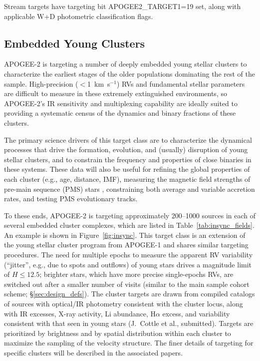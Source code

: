 \documentclass[12pt,twocolumn]{emulateapj}
\begin{document}
Stream targets have targeting bit APOGEE2\_TARGET1=19 set, along with applicable W+D photometric classification flags.


\subsection{Embedded Young Clusters}
\label{sec:young_clusters}

APOGEE-2 is targeting a number of deeply embedded young stellar clusters to characterize the earliest stages of the older populations dominating the rest of the sample.  High-precision ($<$1~km~s$^{-1}$) RVs and fundamental stellar parameters are difficult to measure in these extremely extinguished environments, so APOGEE-2's IR sensitivity and multiplexing capability are ideally suited to providing a systematic census of the dynamics and binary fractions of these clusters.  

The primary science drivers of this target class are to characterize the dynamical processes that drive the formation, evolution, and (usually) disruption of young stellar clusters, and to constrain the frequency and properties of close binaries in these systems.  These data will also be useful for refining the global properties of each cluster (e.g., age, distance, IMF), measuring the magnetic field strengths of pre-main sequence (PMS) stars \citep[e.g.,][]{JohnsKrull_2009_BFieldClassI}, constraining both average and variable accretion rates, and testing PMS evolutionary tracks.

To these ends, APOGEE-2 is targeting approximately 200--1000 sources in each of several embedded cluster complexes, which are listed in Table~\ref{tab:insync_fields}.  An example is shown in Figure~\ref{fig:insync}.  This target class is an extension of the young stellar cluster program from APOGEE-1 \citep[IN-SYNC;][]{Cottaar_2014_insync} and shares similar targeting procedures.  The need for multiple epochs to measure the apparent RV variability (``jitter'', e.g., due to spots and outflows) of young stars drives a magnitude limit of $H \leq 12.5$; brighter stars, which have more precise single-epochs RVs, are switched out after a smaller number of visits (similar to the main sample cohort scheme; \S\ref{sec:design_defs}).  The cluster targets are drawn from compiled catalogs of sources with optical/IR photometry consistent with the cluster locus, along with IR excesses, X-ray activity, Li abundance, H$\alpha$ excess, and variability consistent with that seen in young stars (J.~Cottle et al., submitted).  Targets are prioritized by brightness and by spatial distribution within each cluster to maximize the sampling of the velocity structure.  The finer details of targeting for specific clusters will be described in the associated papers.
\end{document}
